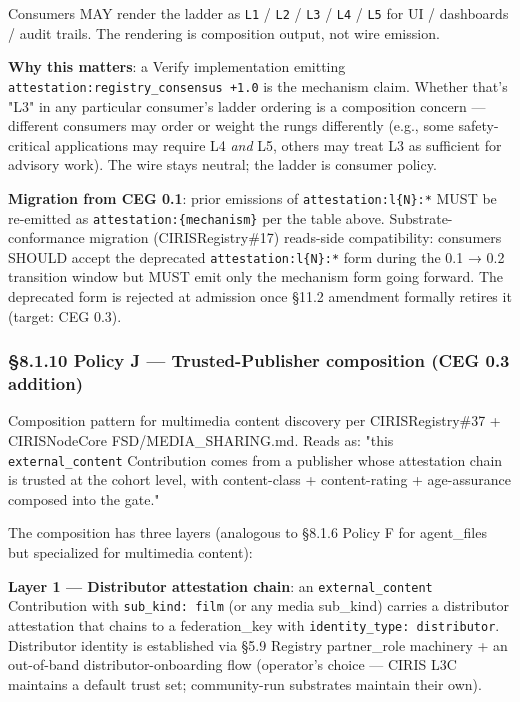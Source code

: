 \documentclass[11pt]{article}
\begin{document}
Consumers MAY render the ladder as \texttt{L1} / \texttt{L2} / \texttt{L3} / \texttt{L4} / \texttt{L5} for UI / dashboards / audit trails. The rendering is composition output, not wire emission.


\textbf{Why this matters}: a Verify implementation emitting \texttt{attestation:registry\_consensus +1.0} is the mechanism claim. Whether that's "L3" in any particular consumer's ladder ordering is a composition concern — different consumers may order or weight the rungs differently (e.g., some safety-critical applications may require L4 \textit{and} L5, others may treat L3 as sufficient for advisory work). The wire stays neutral; the ladder is consumer policy.


\textbf{Migration from CEG 0.1}: prior emissions of \texttt{attestation:l\{N\}:*} MUST be re-emitted as \texttt{attestation:\{mechanism\}} per the table above. Substrate-conformance migration (CIRISRegistry\#17) reads-side compatibility: consumers SHOULD accept the deprecated \texttt{attestation:l\{N\}:*} form during the 0.1 → 0.2 transition window but MUST emit only the mechanism form going forward. The deprecated form is rejected at admission once §11.2 amendment formally retires it (target: CEG 0.3).


\subsubsection*{§8.1.10 Policy J — Trusted-Publisher composition (CEG 0.3 addition)}


Composition pattern for multimedia content discovery per CIRISRegistry\#37 + CIRISNodeCore FSD/MEDIA\_SHARING.md. Reads as: "this \texttt{external\_content} Contribution comes from a publisher whose attestation chain is trusted at the cohort level, with content-class + content-rating + age-assurance composed into the gate."


The composition has three layers (analogous to §8.1.6 Policy F for agent\_files but specialized for multimedia content):


\textbf{Layer 1 — Distributor attestation chain}: an \texttt{external\_content} Contribution with \texttt{sub\_kind: film} (or any media sub\_kind) carries a distributor attestation that chains to a federation\_key with \texttt{identity\_type: distributor}. Distributor identity is established via §5.9 Registry partner\_role machinery + an out-of-band distributor-onboarding flow (operator's choice — CIRIS L3C maintains a default trust set; community-run substrates maintain their own).
\end{document}
